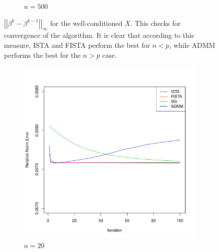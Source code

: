 \documentclass[12pt, leqno]{article}
\newcommand{\norm}[1]{\left|\left|#1\right|\right|}
\theoremstyle{remark}
\begin{document}
\begin{figure}[H]
\begin{subfigure}[b]{0.4\textwidth}
        \caption{$n=500$}
        \label{fig:500}
    \end{subfigure}
\caption{$\norm{\beta^{k}-\beta^{k-1}}_{\infty}$ for the well-conditioned $X$. This checks for convergence of the algorithm. It is clear that according to this measure, ISTA and FISTA perform the best for $n<p$, while ADMM performs the best for the $n>p$ case.}
\label{fig:cvgc}
\end{figure}

\begin{figure}[H]
  \centering
    \begin{subfigure}[b]{0.4\textwidth}
        \includegraphics[width=\textwidth]{20cvgc2.pdf}
        \caption{$n=20$}
        \label{fig:20}
    \end{subfigure}
~
    \begin{subfigure}[b]{0.4\textwidth}

\end{subfigure}
\end{figure}
\end{document}

